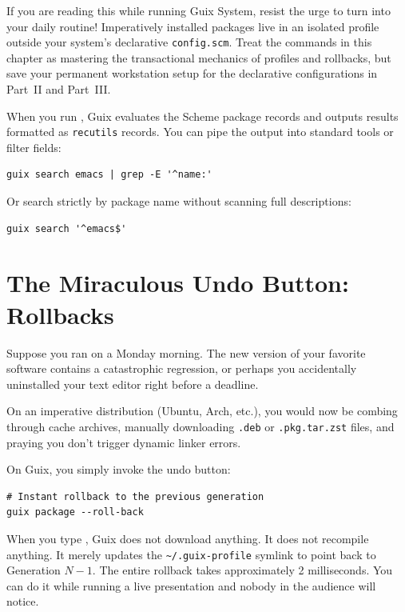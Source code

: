 \begin{footgunbox}
If you are reading this while running Guix System, resist the urge to turn  into your daily routine! Imperatively installed packages live in an isolated profile outside your system's declarative \texttt{config.scm}. Treat the commands in this chapter as mastering the transactional mechanics of profiles and rollbacks, but save your permanent workstation setup for the declarative configurations in Part~II and Part~III.
\end{footgunbox}

\begin{protipbox}
When you run , Guix evaluates the Scheme package records and outputs results formatted as \texttt{recutils} records. You can pipe the output into standard tools or filter fields:
\begin{lstlisting}[style=guixcli]
guix search emacs | grep -E '^name:'
\end{lstlisting}
Or search strictly by package name without scanning full descriptions:
\begin{lstlisting}[style=guixcli]
guix search '^emacs$'
\end{lstlisting}
\end{protipbox}

\section{The Miraculous Undo Button: Rollbacks}

Suppose you ran  on a Monday morning. The new version of your favorite software contains a catastrophic regression, or perhaps you accidentally uninstalled your text editor right before a deadline.

On an imperative distribution (Ubuntu, Arch, etc.), you would now be combing through cache archives, manually downloading \texttt{.deb} or \texttt{.pkg.tar.zst} files, and praying you don't trigger dynamic linker errors.

On Guix, you simply invoke the undo button:

\begin{lstlisting}[style=guixcli]
# Instant rollback to the previous generation
guix package --roll-back
\end{lstlisting}

\begin{tearsbox}
When you type , Guix does not download anything. It does not recompile anything. It merely updates the \texttt{\textasciitilde/.guix-profile} symlink to point back to Generation $N-1$. The entire rollback takes approximately 2 milliseconds. You can do it while running a live presentation and nobody in the audience will notice.
\end{tearsbox}

